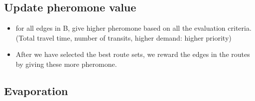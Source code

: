 \subsection{Update pheromone value}
\begin{algorithm}[H]
\end{algorithm}

\begin{itemize}
\item for all edges in B, give higher pheromone based on all the evaluation criteria. (Total travel time, number of transits, higher demand: higher priority)
\item After we have selected the best route sets, we reward the edges in the routes by giving these more pheromone.
\end{itemize}

\subsection{Evaporation}
\begin{algorithm}[H]
\end{algorithm}





